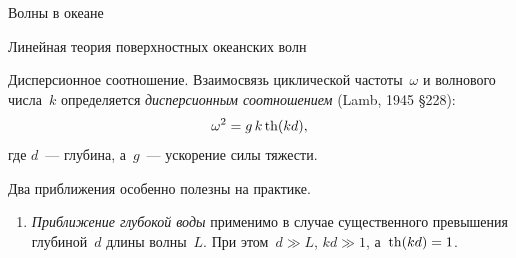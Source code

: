 \begin{chapter}{Волны в океане}
\begin{section}{Линейная теория поверхностных океанских волн}
\begin{paragraph}{Дисперсионное соотношение.}
%
Взаимосвязь циклической частоты~$\omega$ 
и волнового числа~$k$ определяется
\emph{дисперсионным соотношением} (Lamb, 1945 \S{228}):
\begin{equation}
 \omega ^{2} = g \, k \mathop{\mathrm{th}}\nolimits (k d),
\end{equation}
где $d$~--- глубина, а~$g$~--- ускорение силы тяжести.
%

Два приближения особенно полезны на практике.
%
\begin{enumerate}
\item \emph{Приближение глубокой воды} применимо в случае существенного
превышения глубиной~$d$ длины волны~$L$. При этом~$d \gg L$,
$kd \gg 1$, а~$\mathop{\mathrm{th}}\nolimits (kd) = 1$.
%


\end{enumerate}
\end{paragraph}
\end{section}
\end{chapter}

